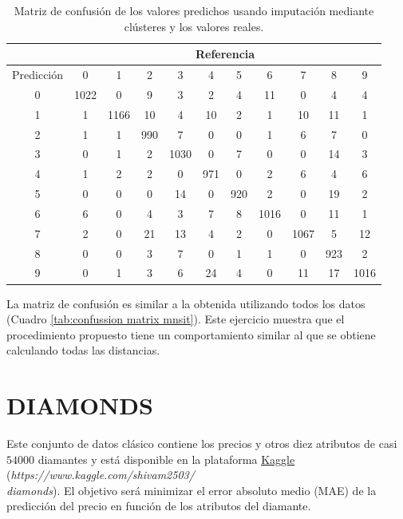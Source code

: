 \documentclass[12pt]{report} %
\theoremstyle{definition}
\begin{document}
{\begin{table}[H]
	\centering
	\caption{Matriz de confusión de los valores predichos usando imputación mediante clústeres y los valores reales.}
	\begin{tabular}{|c|c|c|c|c|c|c|c|c|c|c|}
		\hline
		& \multicolumn{10}{c|}{Referencia}                                \\ \hline
		Predicción & 0    & 1    & 2   & 3    & 4   & 5   & 6    & 7    & 8   & 9    \\ \hline
		0          & 1022 & 0    & 9   & 3    & 2   & 4   & 11   & 0    & 4   & 4    \\ \hline
		1          & 1    & 1166 & 10  & 4    & 10  & 2   & 1    & 10   & 11  & 1    \\ \hline
		2          & 1    & 1    & 990 & 7    & 0   & 0   & 1    & 6    & 7   & 0    \\ \hline
		3          & 0    & 1    & 2   & 1030 & 0   & 7   & 0    & 0    & 14  & 3    \\ \hline
		4          & 1    & 2    & 2   & 0    & 971 & 0   & 2    & 6    & 4   & 6    \\ \hline
		5          & 0    & 0    & 0   & 14   & 0   & 920 & 2    & 0    & 19  & 2    \\ \hline
		6          & 6    & 0    & 4   & 3    & 7   & 8   & 1016 & 0    & 11  & 1    \\ \hline
		7          & 2    & 0    & 21  & 13   & 4   & 2   & 0    & 1067 & 5   & 12   \\ \hline
		8          & 0    & 0    & 3   & 7    & 0   & 1   & 1    & 0    & 923 & 2    \\ \hline
		9          & 0    & 1    & 3   & 6    & 24  & 4   & 0    & 11   & 17  & 1016 \\ \hline
	\end{tabular}
\end{table}

\noindent La matriz de confusión es similar a la obtenida utilizando todos los datos (Cuadro \ref{tab:confussion matrix mnsit}). Este ejercicio muestra que el procedimiento propuesto tiene un comportamiento similar al que se obtiene calculando todas las distancias.

\section{DIAMONDS}
Este conjunto de datos clásico contiene los precios y otros diez atributos de casi $54000$ diamantes y está disponible en la plataforma {\href{https://www.kaggle.com/shivam2503/diamonds}{\underline{Kaggle}} (\emph{https://www.kaggle.com/shivam2503/}\\
\emph{diamonds}). El objetivo será minimizar el error absoluto medio (MAE) de la predicción del precio en función de los atributos del diamante. \\

}}
\end{document}
